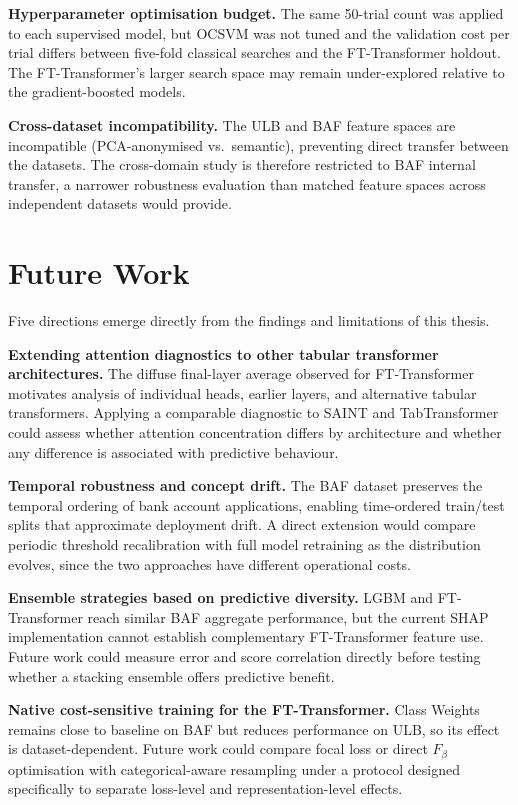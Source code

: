 \textbf{Hyperparameter optimisation budget.} The same 50-trial count was applied to each supervised model, but OCSVM was not tuned and the validation cost per trial differs between five-fold classical searches and the FT-Transformer holdout. The FT-Transformer's larger search space may remain under-explored relative to the gradient-boosted models.

\textbf{Cross-dataset incompatibility.} The ULB and BAF feature spaces are incompatible (PCA-anonymised vs.\ semantic), preventing direct transfer between the datasets. The cross-domain study is therefore restricted to BAF internal transfer, a narrower robustness evaluation than matched feature spaces across independent datasets would provide.

\section{Future Work}
\label{sec:future_work}

Five directions emerge directly from the findings and limitations of this thesis.

\textbf{Extending attention diagnostics to other tabular transformer architectures.} The diffuse final-layer average observed for FT-Transformer motivates analysis of individual heads, earlier layers, and alternative tabular transformers. Applying a comparable diagnostic to SAINT and TabTransformer could assess whether attention concentration differs by architecture and whether any difference is associated with predictive behaviour.

\textbf{Temporal robustness and concept drift.} The BAF dataset preserves the temporal ordering of bank account applications, enabling time-ordered train/test splits that approximate deployment drift. A direct extension would compare periodic threshold recalibration with full model retraining as the distribution evolves, since the two approaches have different operational costs.

\textbf{Ensemble strategies based on predictive diversity.} LGBM and FT-Transformer reach similar BAF aggregate performance, but the current SHAP implementation cannot establish complementary FT-Transformer feature use. Future work could measure error and score correlation directly before testing whether a stacking ensemble offers predictive benefit.

\textbf{Native cost-sensitive training for the FT-Transformer.} Class Weights remains close to baseline on BAF but reduces performance on ULB, so its effect is dataset-dependent. Future work could compare focal loss or direct $F_{\beta}$ optimisation with categorical-aware resampling under a protocol designed specifically to separate loss-level and representation-level effects.


